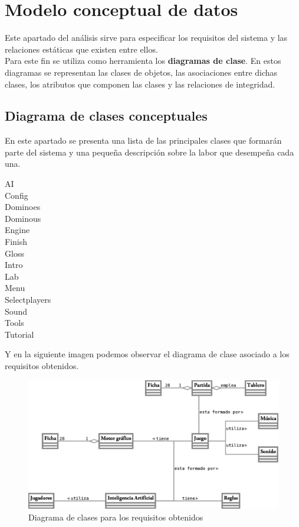 \section{Modelo conceptual de datos}

Este apartado del análisis sirve para especificar los requisitos del sistema y las relaciones estáticas que
existen entre ellos. \\

Para este fin se utiliza como herramienta los \textbf{diagramas de clase}. En estos diagramas se representan
las clases de objetos, las asociaciones entre dichas clases, los atributos que componen las clases y las
relaciones de integridad.

\subsection{Diagrama de clases conceptuales}

En este apartado se presenta una lista de las principales clases que formarán parte del sistema y una pequeña
descripción sobre la labor que desempeña cada una.

\begin{description}
    \item[AI]
    \item[Config]
    \item[Dominoes]
    \item[Dominous]
    \item[Engine]
    \item[Finish]
    \item[Gloss]
    \item[Intro]
    \item[Lab]
    \item[Menu]
    \item[Selectplayers]
    \item[Sound]
    \item[Tools]
    \item[Tutorial]
\end{description}

Y en la siguiente imagen podemos observar el diagrama de clase asociado a los requisitos obtenidos.

\begin{figure}[h]
  \label{diagrama_clases}
  \begin{center}
    \includegraphics[scale=0.7]{diagrama_clases.png}
  \end{center}
  \caption{Diagrama de clases para los requisitos obtenidos}
\end{figure}


